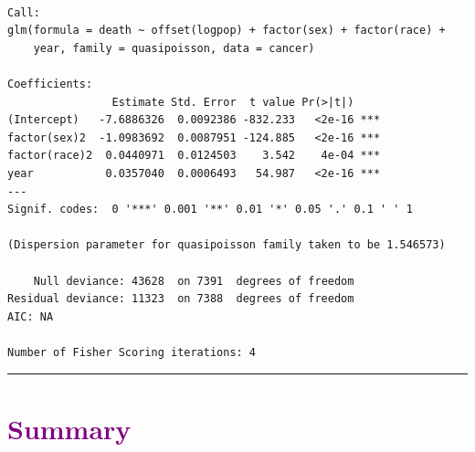 \documentclass[
  letterpaper,
  DIV=11,
  numbers=noendperiod]{scrreprt}
\begin{document}
\begin{verbatim}

Call:
glm(formula = death ~ offset(logpop) + factor(sex) + factor(race) + 
    year, family = quasipoisson, data = cancer)

Coefficients:
                Estimate Std. Error  t value Pr(>|t|)    
(Intercept)   -7.6886326  0.0092386 -832.233   <2e-16 ***
factor(sex)2  -1.0983692  0.0087951 -124.885   <2e-16 ***
factor(race)2  0.0440971  0.0124503    3.542    4e-04 ***
year           0.0357040  0.0006493   54.987   <2e-16 ***
---
Signif. codes:  0 '***' 0.001 '**' 0.01 '*' 0.05 '.' 0.1 ' ' 1

(Dispersion parameter for quasipoisson family taken to be 1.546573)

    Null deviance: 43628  on 7391  degrees of freedom
Residual deviance: 11323  on 7388  degrees of freedom
AIC: NA

Number of Fisher Scoring iterations: 4
\end{verbatim}

\begin{center}\rule{0.5\linewidth}{0.5pt}\end{center}

\hypertarget{section-9}{%
\section*{\texorpdfstring{\textcolor{purple}{Summary}}{}}\label{section-9}}

\markright{\textcolor{purple}{Summary}}
\end{document}
